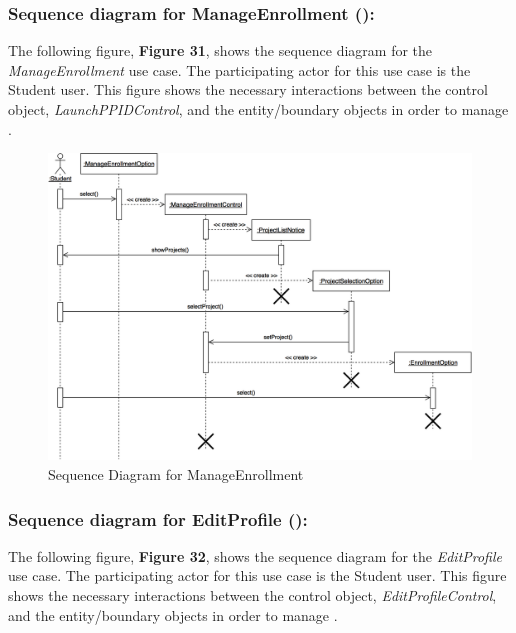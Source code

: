 \documentclass[12pt,letterpaper]{article}
\begin{document}
\subsubsection*{Sequence diagram for ManageEnrollment (\manageenrollment{}):}

The following figure, {\bf Figure 31}, shows the sequence diagram for the {\it ManageEnrollment} use case. The participating actor for this use case
is the Student user. This figure shows the necessary interactions between the control object, {\it LaunchPPIDControl}, and the entity/boundary objects
in order to manage \manageenrollment{}.

\begin{figure}[H]
	\centering{}
	\includegraphics[scale=0.3]{imgs/seq/manage-enrollment.png}
	\caption{Sequence Diagram for ManageEnrollment}
\end{figure}

\subsubsection*{Sequence diagram for EditProfile (\editprofile{}):}

The following figure, {\bf Figure 32}, shows the sequence diagram for the {\it EditProfile} use case. The participating actor for this use case is the 
Student user. This figure shows the necessary interactions between the control object, {\it EditProfileControl}, and the entity/boundary objects
in order to manage \editprofile{}.
\end{document}
